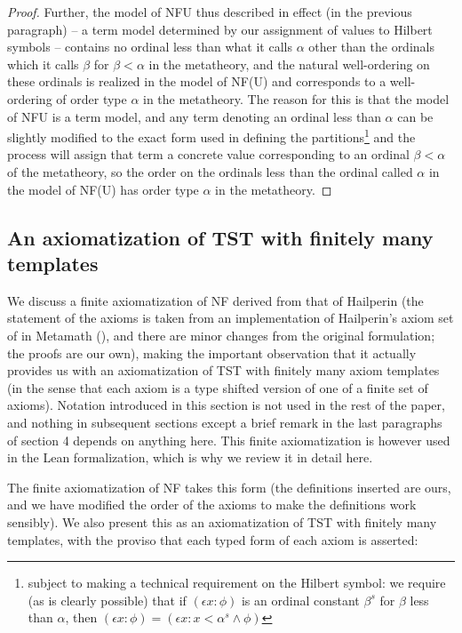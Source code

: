 \documentclass{article}
\newif\ifshowannotations
\newcommand{\abf}{\ifshowannotations\bf\fi}
\theoremstyle{definition}
\theoremstyle{remark}
\begin{document}
{\begin{proof}
Further, the model of NFU {\abf thus described in effect (in the previous paragraph) -- a term model determined by our assignment of values to Hilbert symbols --} contains no ordinal less than what it calls $\alpha$ other than the ordinals which it calls $\beta$ for $\beta<\alpha$ in the metatheory, and the natural well-ordering on these ordinals is realized in the model of NF(U) and corresponds to a well-ordering of order type $\alpha$ in the metatheory.  The reason for this is that the model of NFU is a term model, and any term denoting an ordinal less than $\alpha$ can be slightly modified to the exact form used in defining the partitions\footnote{\abf subject to making a technical requirement on the Hilbert symbol:  we require (as is clearly possible) that if $(\epsilon x:\phi)$ is an ordinal constant $\beta^s$ for $\beta$ less than $\alpha$, then $(\epsilon x:\phi) = (\epsilon x:x <\alpha^s \wedge \phi)$}  and the process will assign that term a concrete value {\abf corresponding to an} ordinal $\beta<\alpha$ of the metatheory, so the order on the ordinals {\abf less than the ordinal called $\alpha$ in the model of NF(U)} has order type $\alpha$ in the metatheory.

\end{proof}

\newpage

\subsection{An axiomatization of TST with finitely many templates}\label{ss:hailperin}


We discuss a finite axiomatization of NF derived from that of Hailperin (the statement of the axioms is taken from an implementation of Hailperin's axiom set of \cite{hailperin} in Metamath (\cite{metamath}), and there are minor changes from the original formulation;  the proofs are our own), making the important observation that it actually provides us with an axiomatization of TST with finitely many
axiom templates (in the sense that each axiom is a type shifted version of one of a finite set of axioms).  Notation introduced in this section is not used in the rest of the paper, and nothing in subsequent sections except a brief remark in the last paragraphs of section 4 depends on anything here.  This finite axiomatization is however used in the Lean formalization, which is why we review it in detail here.

The finite axiomatization of NF takes this form (the definitions inserted are ours, and we have modified the order of the axioms to make the definitions work sensibly).  We also present this as an axiomatization of TST with finitely many templates, with the proviso that each typed form of each axiom is asserted:

}
\end{document}
